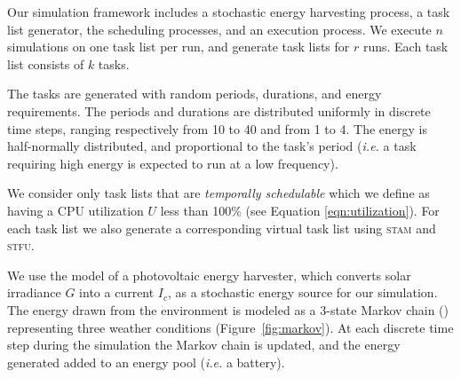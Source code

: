 Our simulation framework includes a stochastic energy harvesting process, a task list generator, the scheduling processes, and an execution process.  
We execute $n$ simulations on one task list per run, and generate task lists for $r$ runs.  Each task list consists of $k$ tasks.


The tasks are generated with random periods, durations, and energy requirements.  The periods and durations are distributed uniformly in discrete time steps, 
ranging respectively from 10 to 40 and from 1 to 4.  
The energy is half-normally distributed, and proportional to the task's period (\emph{i.e.} a task requiring high energy is expected to run at a low frequency).

We consider only task lists that are \emph{temporally schedulable} which we define as having a 
CPU utilization $U$ less than 100\% (see Equation \ref{eqn:utilization}). 
For each task list we also generate a corresponding virtual task list using \textsc{stam} and \textsc{stfu}. 


We use the model of a photovoltaic energy harvester, which converts solar irradiance $G$ into a current $I_c$, as a stochastic energy source for our simulation.  The energy drawn from the environment is modeled as a 3-state Markov chain (\cite{poggi2000stochastic,moser2007real}) representing three weather conditions (Figure~\ref{fig:markov}).  At each discrete time step during the simulation the Markov chain is updated, and the energy generated added to an energy pool (\emph{i.e.} a battery).

